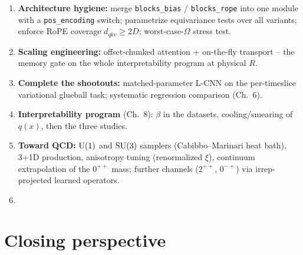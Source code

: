 \begin{enumerate}
  \item \textbf{Architecture hygiene:} merge \texttt{blocks\_bias} /
        \texttt{blocks\_rope} into one module with a
        \texttt{pos\_encoding} switch; parametrize equivariance tests
        over all variants; enforce RoPE coverage $d_{qkv} \ge 2D$;
        worst-case-$\Omega$ stress test.
  \item \textbf{Scaling engineering:} offset-chunked attention +
        on-the-fly transport -- the memory gate on the whole
        interpretability program at physical $R$.
  \item \textbf{Complete the shootouts:} matched-parameter L-CNN on the
        per-timeslice variational glueball task; systematic regression
        comparison (Ch.~6).
  \item \textbf{Interpretability program} (Ch.~8): $\beta$ in the
        datasets, cooling/smearing of $q(x)$, then the three studies.
  \item \textbf{Toward QCD:} $\mathrm{U}(1)$ and $\mathrm{SU}(3)$ samplers
        (Cabibbo--Marinari heat bath), 3+1D production, anisotropy
        tuning (renormalized $\xi$), continuum extrapolation of the
        $0^{++}$ mass; further channels ($2^{++}$, $0^{-+}$) via
        irrep-projected learned operators.
  \item {}
\end{enumerate}

\section{Closing perspective}
\label{sec:concl-closing}

